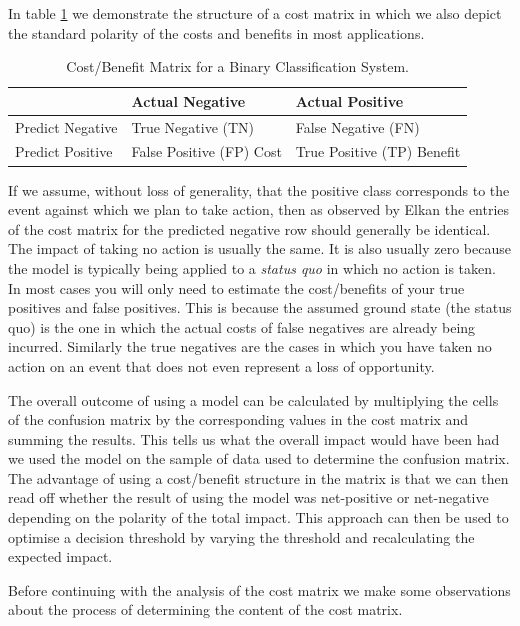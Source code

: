 \documentclass[11pt,a4paper]{article}
\begin{document}
In table \ref{costmatrix} we demonstrate the structure of a cost matrix in which we also depict the standard polarity of the costs and
benefits in most applications.

\begin{table}[htbp]
\centering
 \caption{Cost/Benefit Matrix for a Binary Classification System.}
 \label{costmatrix}
  \begin{tabular}{|l||l|l|}
   \toprule
                          &Actual Negative              &Actual Positive       \\
   \midrule
   Predict Negative       &True Negative (TN)           &False Negative (FN)           \\
   Predict Positive       &False Positive (FP) Cost     &True Positive (TP) Benefit    \\
   \bottomrule
  \end{tabular}
\end{table}

If we assume, without loss of generality, that the positive class corresponds to the event against which we
plan to take action, then as observed by Elkan \cite{Elkan2001} the entries of the cost matrix for the predicted
negative row should generally be identical. The impact of taking no action
is usually the same. It is also usually zero because the model is typically being applied
to a \textit{status quo} in which no action is taken.
In most cases you will only need to estimate the cost/benefits of your true positives
and false positives. This is because the assumed ground state (the status quo) is the
one in which the actual costs of false negatives are already being incurred. Similarly
the true negatives are the cases in which you have taken no action on an event that
does not even represent a loss of opportunity.

The overall outcome of using a model can be calculated by multiplying the cells of the confusion matrix by the corresponding
values in the cost matrix and summing the results. This tells us what the overall impact would have been had we used the model
on the sample of data used to determine the confusion matrix. The advantage of using a cost/benefit structure in the matrix is
that we can then read off whether the result of using the model was net-positive or net-negative depending on the polarity of
the total impact. This approach can then be used to optimise a decision threshold
by varying the threshold and recalculating the expected impact.

Before continuing with the analysis of the cost matrix we make some observations about the process of determining the content
of the cost matrix.
\end{document}
